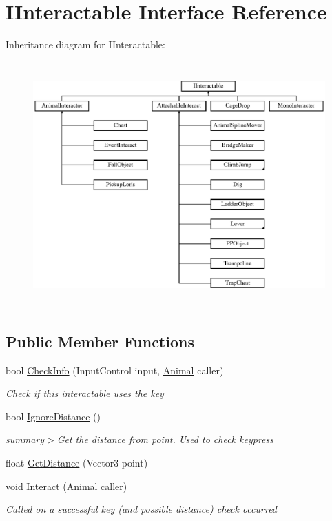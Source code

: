 \hypertarget{interface_i_interactable}{}\section{I\+Interactable Interface Reference}
\label{interface_i_interactable}
Inheritance diagram for I\+Interactable\+:\begin{figure}[H]
\begin{center}
\leavevmode
\includegraphics[height=9.476923cm]{interface_i_interactable}
\end{center}
\end{figure}
\subsection*{Public Member Functions}
\begin{DoxyCompactItemize}
\item 
bool \mbox{\hyperlink{interface_i_interactable_a5142ebbddd5d91a93da436941ad77d8e}{Check\+Info}} (Input\+Control input, \mbox{\hyperlink{class_animal}{Animal}} caller)
\begin{DoxyCompactList}\small\item\em Check if this interactable uses the key\end{DoxyCompactList}\item 
bool \mbox{\hyperlink{interface_i_interactable_ad184024a0cc6bce38ebcd77c0126fcc5}{Ignore\+Distance}} ()
\begin{DoxyCompactList}\small\item\em summary$>$Get the distance from point. Used to check keypress\end{DoxyCompactList}\item 
float \mbox{\hyperlink{interface_i_interactable_acde3047364ffe9a4ed107513feb21675}{Get\+Distance}} (Vector3 point)
\item 
void \mbox{\hyperlink{interface_i_interactable_ae38fb77e97bc1066db045b32db647681}{Interact}} (\mbox{\hyperlink{class_animal}{Animal}} caller)
\begin{DoxyCompactList}\small\item\em Called on a successful key (and possible distance) check occurred\end{DoxyCompactList}\end{DoxyCompactItemize}


